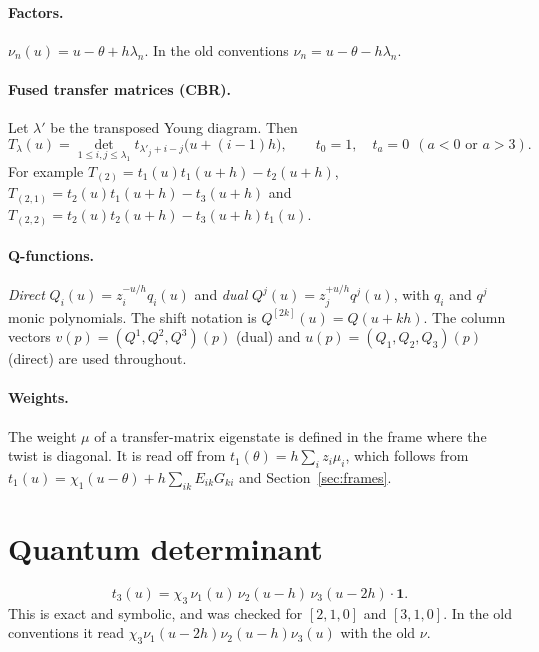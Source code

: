 \documentclass[11pt]{article}
\begin{document}
\paragraph{Factors.} $\nu_n(u)=u-\theta+h\lambda_n$. In the old conventions $\nu_n=u-\theta-h\lambda_n$.

\paragraph{Fused transfer matrices (CBR).} Let $\lambda'$ be the transposed Young diagram. Then
\begin{equation}
T_\lambda(u)=\det_{1\le i,j\le\lambda_1}t_{\lambda'_j+i-j}\big(u+(i-1)h\big),\qquad t_0=1,\quad t_a=0\ \ (a<0\text{ or }a>3).
\end{equation}
For example $T_{(2)}=t_1(u)t_1(u+h)-t_2(u+h)$, $T_{(2,1)}=t_2(u)t_1(u+h)-t_3(u+h)$ and $T_{(2,2)}=t_2(u)t_2(u+h)-t_3(u+h)t_1(u)$.

\paragraph{Q-functions.} \emph{Direct} $Q_i(u)=z_i^{-u/h}q_i(u)$ and \emph{dual} $Q^j(u)=z_j^{+u/h}q^j(u)$, with $q_i$ and $q^j$ monic polynomials. The shift notation is $Q^{[2k]}(u)=Q(u+kh)$. The column vectors $v(p)=(Q^1,Q^2,Q^3)(p)$ (dual) and $u(p)=(Q_1,Q_2,Q_3)(p)$ (direct) are used throughout.

\paragraph{Weights.} The weight $\mu$ of a transfer-matrix eigenstate is defined in the frame where the twist is diagonal. It is read off from $t_1(\theta)=h\sum_iz_i\mu_i$, which follows from $t_1(u)=\chi_1(u-\theta)+h\sum_{ik}E_{ik}G_{ki}$ and Section~\ref{sec:frames}.

\section{Quantum determinant}
\begin{equation}
t_3(u)=\chi_3\,\nu_1(u)\,\nu_2(u-h)\,\nu_3(u-2h)\cdot\mathbf{1} .
\end{equation}
This is exact and symbolic, and was checked for $[2,1,0]$ and $[3,1,0]$. In the old conventions it read $\chi_3\nu_1(u-2h)\nu_2(u-h)\nu_3(u)$ with the old $\nu$.

\end{document}
